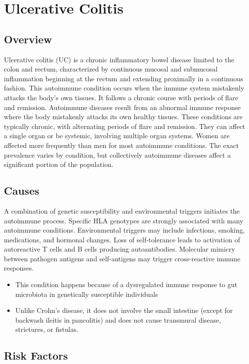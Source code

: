 \chapter{Ulcerative Colitis}
\label{sec:Ulcerative Colitis}

\section{Overview}
Ulcerative colitis (UC) is a chronic inflammatory bowel disease limited to the colon and rectum, characterized by continuous mucosal and submucosal inflammation beginning at the rectum and extending proximally in a continuous fashion. This autoimmune condition occurs when the immune system mistakenly attacks the body's own tissues. It follows a chronic course with periods of flare and remission. Autoimmune diseases result from an abnormal immune response where the body mistakenly attacks its own healthy tissues. These conditions are typically chronic, with alternating periods of flare and remission. They can affect a single organ or be systemic, involving multiple organ systems. Women are affected more frequently than men for most autoimmune conditions. The exact prevalence varies by condition, but collectively autoimmune diseases affect a significant portion of the population.
\section{Causes}
A combination of genetic susceptibility and environmental triggers initiates the autoimmune process. Specific HLA genotypes are strongly associated with many autoimmune conditions. Environmental triggers may include infections, smoking, medications, and hormonal changes. Loss of self-tolerance leads to activation of autoreactive T cells and B cells producing autoantibodies. Molecular mimicry between pathogen antigens and self-antigens may trigger cross-reactive immune responses.

\begin{itemize}[noitemsep]
  \item This condition happens because of a dysregulated immune response to gut microbiota in genetically susceptible individuals
  \item Unlike Crohn's disease, it does not involve the small intestine (except for backwash ileitis in pancolitis) and does not cause transmural disease, strictures, or fistulas.
\end{itemize}
\section{Risk Factors}


